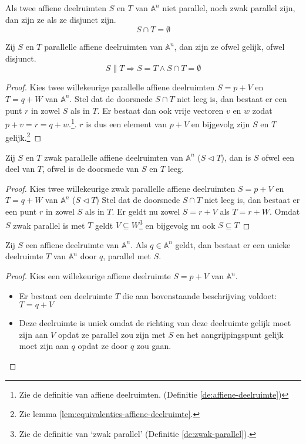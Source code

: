 \documentclass[main.tex]{subfiles}
\begin{document}
\begin{de}
  Als twee affiene deelruimten $S$ en $T$ van $\mathbb{A}^{n}$ niet parallel, noch zwak parallel zijn, dan zijn ze  als ze disjunct zijn.
  \[ S \cap T = \emptyset \]
\end{de}

\begin{st}
  Zij $S$ en $T$ parallelle affiene deelruimten van $\mathbb{A}^{n}$, dan zijn ze ofwel gelijk, ofwel disjunct.
  \[ S \parallel T \Rightarrow S=T \wedge S \cap T = \emptyset \]

  \begin{proof}
    Kies twee willekeurige parallelle affiene deelruimten $S = p + V$ en $T = q + W$ van $\mathbb{A}^{n}$.
    Stel dat de doorsnede $S \cap T$ niet leeg is, dan bestaat er een punt $r$ in zowel $S$ als in $T$.
    Er bestaat dan ook vrije vectoren $v$ en $w$ zodat $p + v = r = q + w$.\footnote{Zie de definitie van affiene deelruimten. (Definitie \ref{de:affiene-deelruimte})}.
    $r$ is dus een element van $p + V$ en bijgevolg zijn $S$ en $T$ gelijk.\footnote{Zie lemma \ref{lem:equivalenties-affiene-deelruimte}.}
  \end{proof}
\end{st}

\begin{st}
  Zij $S$ en $T$ zwak parallelle affiene deelruimten van $\mathbb{A}^{n}$ ($S \vartriangleleft  T$), dan is $S$ ofwel een deel van $T$, ofwel is de doorsnede van $S$ en $T$ leeg.

  \begin{proof}
    Kies twee willekeurige zwak parallelle affiene deelruimten $S = p + V$ en $T = q + W$ van $\mathbb{A}^{n}$ ($S \vartriangleleft  T$)
    Stel dat de doorsnede $S \cap T$ niet leeg is, dan bestaat er een punt $r$ in zowel $S$ als in $T$.
    Er geldt nu zowel $S = r + V$ als $T = r + W$.
    Omdat $S$ zwak parallel is met $T$ geldt $V \subseteq W$\footnote{Zie de definitie van `zwak parallel' (Definitie \ref{de:zwak-parallel}).} en bijgevolg nu ook $S \subseteq T$
  \end{proof}
\end{st}

\begin{st}
  Zij $S$ een affiene deelruimte van $\mathbb{A}^{n}$.
  Als $q \in \mathbb{A}^{n}$ geldt, dan bestaat er een unieke deelruimte $T$ van $\mathbb{A}^{n}$ door $q$, parallel met $S$.

  \begin{proof}
    Kies een willekeurige affiene deelruimte $S = p + V$ van $\mathbb{A}^{n}$.
    \begin{itemize}
    \item Er bestaat een deelruimte $T$ die aan bovenstaande beschrijving voldoet: $T = q + V$
    \item Deze deelruimte is uniek omdat de richting van deze deelruimte gelijk moet zijn aan $V$ opdat ze parallel zou zijn met $S$ en het aangrijpingspunt gelijk moet zijn aan $q$ opdat ze door $q$ zou gaan.
    \end{itemize}
  \end{proof}
\end{st}
\end{document}
